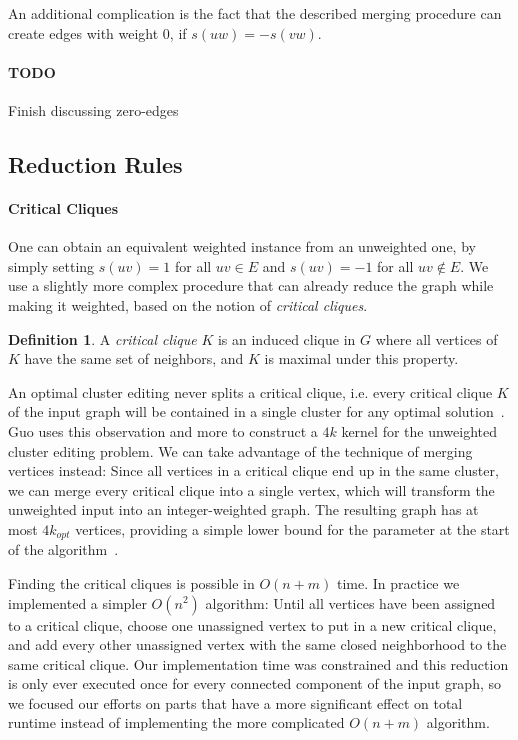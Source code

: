 \documentclass{article}
\newcommand{\todo}[1]{\paragraph{TODO} #1}
\theoremstyle{definition}
\newtheorem{definition}[theorem]{Definition}
\begin{document}
An additional complication is the fact that the described merging procedure can create edges with
weight 0, if $s(uw) = -s(vw)$.
\todo Finish discussing zero-edges

\subsection{Reduction Rules}

\paragraph{Critical Cliques} One can obtain an equivalent weighted instance from an unweighted one,
by simply setting $s(uv) = 1$ for all $uv \in E$ and $s(uv) = -1$ for all $uv \notin E$. We use a
slightly more complex procedure that can already reduce the graph while making it weighted, based on
the notion of \emph{critical cliques}.

\begin{definition}
	A \emph{critical clique} $K$ is an induced clique in $G$ where all vertices of $K$ have the same
	set of neighbors, and $K$ is maximal under this property. 
\end{definition}

An optimal cluster editing never splits a critical clique, i.e. every critical clique $K$ of the
input graph will be contained in a single cluster for any optimal solution~\cite{Guo}. Guo uses this
observation and more to construct a $4k$ kernel for the unweighted cluster editing problem. We can
take advantage of the technique of merging vertices instead: Since all vertices in a critical clique
end up in the same cluster, we can merge every critical clique into a single vertex, which will
transform the unweighted input into an integer-weighted graph. The resulting graph has at most
$4k_{opt}$ vertices, providing a simple lower bound for the parameter at the start of the
algorithm~\cite{GoingWeighted, Guo}.

Finding the critical cliques is possible in $O(n + m)$ time. In practice we implemented a simpler
$O(n^2)$ algorithm: Until all vertices have been assigned to a critical clique, choose one
unassigned vertex to put in a new critical clique, and add every other unassigned vertex with the
same closed neighborhood to the same critical clique. Our implementation time was constrained and
this reduction is only ever executed once for every connected component of the input graph, so we
focused our efforts on parts that have a more significant effect on total runtime instead of
implementing the more complicated $O(n + m)$ algorithm.
\end{document}
